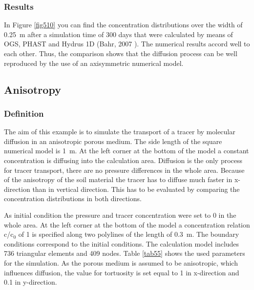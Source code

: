 \subsubsection{Results}

In Figure \ref{fig510} you can find the concentration distributions over the width of 0.25~m after a simulation time of 300 days that were calculated by means of OGS, PHAST and Hydrus 1D (Bahr, 2007 \cite{Bahr:2007}). The numerical results accord well to each other. Thus, the comparison shows that the diffusion process can be well reproduced by the use of an axisymmetric numerical model.

\subsection{Anisotropy}

\subsubsection{Definition}

The aim of this example is to simulate the transport of a tracer by molecular diffusion in an anisotropic porous medium. The side length of the square numerical model is 1~m. At the left corner at the bottom of the model a constant concentration is diffusing into the calculation area. Diffusion is the only process for tracer transport, there are no pressure differences in the whole area. Because of the anisotropy of the soil material the tracer has to diffuse much faster in x-direction than in vertical direction. This has to be evaluated by comparing the concentration distributions in both directions.

As initial condition the pressure and tracer concentration were set to 0 in the whole area. At the left corner at the bottom of the model a concentration relation c/c$_0$ of 1 is specified along two polylines of the length of 0.3~m. The boundary conditions correspond to the initial conditions. The calculation model includes 736 triangular elements and 409 nodes. Table \ref{tab55} shows the used parameters for the simulation. As the porous medium is assumed to be anisotropic, which influences diffusion, the value for tortuosity is set equal to 1 in x-direction and 0.1 in y-direction.

